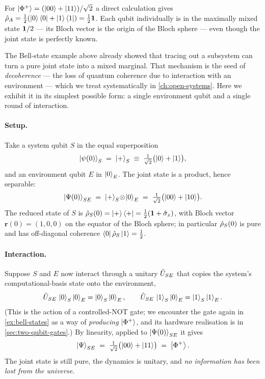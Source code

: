\begin{example}
For $\ket{\Phi^+}=(\ket{00}+\ket{11})/\sqrt2$ a direct calculation
gives
$\hat{\rho}_A = \tfrac12(\ket{0}\bra{0}+\ket{1}\bra{1}) = \tfrac12\mathbf{1}$.
Each qubit individually is in the maximally mixed state $\mathbf{1}/2$ ---
its Bloch vector is the origin of the Bloch sphere --- even though
the joint state is perfectly known.
\end{example}

\begin{example}
\label{ex:decoherence-by-partial-trace}
The Bell-state example above already showed that tracing out a
subsystem can turn a pure joint state into a mixed marginal. That
mechanism is the seed of \emph{decoherence} --- the loss of
quantum coherence due to interaction with an environment --- which
we treat systematically in \cref{ch:open-systems}. Here we exhibit
it in its simplest possible form: a single environment qubit and a
single round of interaction.

\paragraph{Setup.}
Take a system qubit $S$ in the equal superposition
\begin{equation}
\ket{\psi(0)}_S \;=\; \ket{+}_S
\;\equiv\; \tfrac{1}{\sqrt 2}\bigl(\ket{0}+\ket{1}\bigr),
\end{equation}
and an environment qubit $E$ in $\ket{0}_E$. The joint state is a
product, hence separable:
\begin{equation}
\ket{\Psi(0)}_{SE}
\;=\; \ket{+}_S\!\otimes\!\ket{0}_E
\;=\; \tfrac{1}{\sqrt 2}\bigl(\ket{00}+\ket{10}\bigr).
\end{equation}
The reduced state of $S$ is
$\hat{\rho}_S(0)=\ket{+}\bra{+}=\tfrac12(\mathbf{1}+\hat\sigma_x)$, with
Bloch vector $\bm{r}(0)=(1,0,0)$ on the equator of the Bloch
sphere; in particular $\hat{\rho}_S(0)$ is pure and has off-diagonal
coherence $\bra{0}\hat{\rho}_S\ket{1}=\tfrac12$.

\paragraph{Interaction.}
Suppose $S$ and $E$ now interact through a unitary $\hat{U}_{SE}$
that copies the system's computational-basis state onto the
environment,
\begin{equation}
\hat{U}_{SE}\,\ket{0}_S\ket{0}_E = \ket{0}_S\ket{0}_E,
\qquad
\hat{U}_{SE}\,\ket{1}_S\ket{0}_E = \ket{1}_S\ket{1}_E.
\end{equation}
(This is the action of a controlled-NOT gate; we encounter the
gate again in \cref{ex:bell-states} as a way of \emph{producing}
$\ket{\Phi^+}$, and its hardware realisation is in
\cref{sec:two-qubit-gates}.) By linearity, applied to
$\ket{\Psi(0)}_{SE}$ it gives
\begin{equation}
\ket{\Psi}_{SE}
\;=\; \tfrac{1}{\sqrt 2}\bigl(\ket{00}+\ket{11}\bigr)
\;=\; \ket{\Phi^+}.
\end{equation}
The joint state is still pure, the dynamics is unitary, and \emph{no
information has been lost from the universe}.


\end{example}
